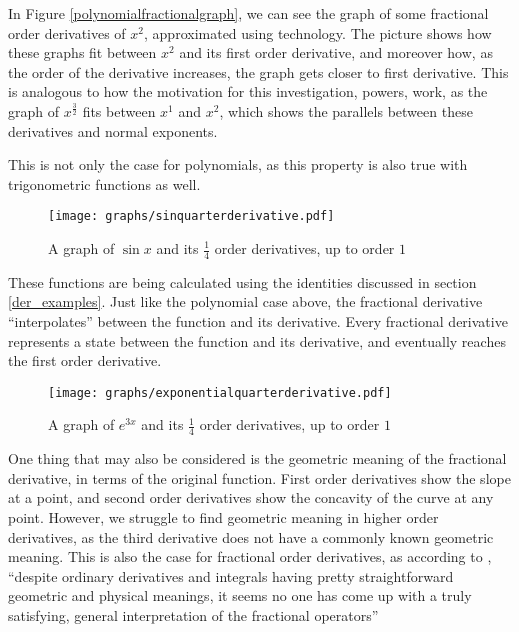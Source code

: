 \documentclass{article}
\def\graphscale{0.7}
\begin{document}
In Figure \ref{polynomialfractionalgraph}, we can see the graph of some fractional order
derivatives of $x^2$, approximated using technology. The picture shows how
these graphs fit between $x^2$ and its first order derivative, and moreover
how, as the order of the derivative increases, the graph gets closer to first
derivative. This is analogous to how the motivation for this investigation,
powers, work, as the graph of $x^\frac{3}{2}$ fits between $x^1$ and $x^2$,
which shows the parallels between these derivatives and normal exponents.

This is not only the case for polynomials, as this property is also true with
trigonometric functions as well.

\begin{figure}[H]
	\centering
	\texttt{[image: graphs/sinquarterderivative.pdf]}
	\caption{A graph of $\sin{x}$ and its $\frac{1}{4}$ order derivatives, up to order $1$} \label{sinfractionalgraph}
\end{figure}

These functions are being calculated using the identities discussed in section
\ref{der_examples}. Just like the polynomial case above, the fractional
derivative ``interpolates'' between the function and its derivative. Every
fractional derivative represents a state between the function and its
derivative, and eventually reaches the first order derivative.

\begin{figure}[H]
	\centering
	\texttt{[image: graphs/exponentialquarterderivative.pdf]}
	\caption{A graph of $e^{3x}$ and its $\frac{1}{4}$ order derivatives, up to order $1$} \label{exponentialfractionalgraph}
\end{figure}

One thing that may also be considered is the geometric meaning of the
fractional derivative, in terms of the original function. First order
derivatives show the slope at a point, and second order derivatives show the
concavity of the curve at any point. However, we struggle to find geometric
meaning in higher order derivatives, as the third derivative does not have a
commonly known geometric meaning. This is also the case for fractional order
derivatives, as according to \parencite{morphocular2022}, ``despite ordinary
derivatives and integrals having pretty straightforward geometric and physical
meanings, it seems no one has come up with a truly satisfying, general
interpretation of the fractional operators''
\end{document}
